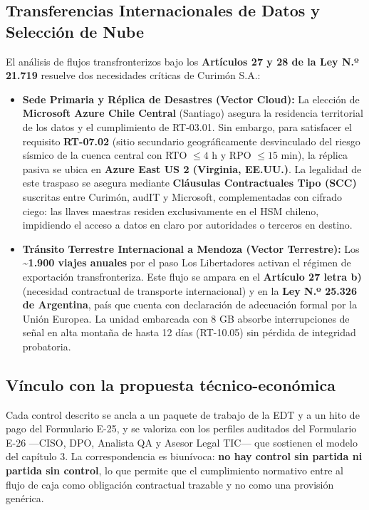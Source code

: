 \subsection{Transferencias Internacionales de Datos y Selección de Nube}\label{transferencias-internacionales-de-datos-y-selecciuxf3n-de-nube}

El análisis de flujos transfronterizos bajo los \textbf{Artículos 27 y 28 de la Ley N.º 21.719} resuelve dos necesidades críticas de Curimón S.A.:

\begin{itemize}
\tightlist
\item
  \textbf{Sede Primaria y Réplica de Desastres (Vector Cloud):} La elección de \textbf{Microsoft Azure Chile Central} (Santiago) asegura la residencia territorial de los datos y el cumplimiento de RT-03.01. Sin embargo, para satisfacer el requisito \textbf{RT-07.02} (sitio secundario geográficamente desvinculado del riesgo sísmico de la cuenca central con RTO \(\le 4\text{ h}\) y RPO \(\le 15\text{ min}\)), la réplica pasiva se ubica en \textbf{Azure East US 2 (Virginia, EE.UU.)}. La legalidad de este traspaso se asegura mediante \textbf{Cláusulas Contractuales Tipo (SCC)} suscritas entre Curimón, audIT y Microsoft, complementadas con cifrado ciego: las llaves maestras residen exclusivamente en el HSM chileno, impidiendo el acceso a datos en claro por autoridades o terceros en destino.
\item
  \textbf{Tránsito Terrestre Internacional a Mendoza (Vector Terrestre):} Los \textbf{\textasciitilde1.900 viajes anuales} por el paso Los Libertadores activan el régimen de exportación transfronteriza. Este flujo se ampara en el \textbf{Artículo 27 letra b)} (necesidad contractual de transporte internacional) y en la \textbf{Ley N.º 25.326 de Argentina}, país que cuenta con declaración de adecuación formal por la Unión Europea. La unidad embarcada con 8 GB absorbe interrupciones de señal en alta montaña de hasta 12 días (RT-10.05) sin pérdida de integridad probatoria.
\end{itemize}

\subsection{Vínculo con la propuesta técnico-económica}\label{vuxednculo-con-la-propuesta-tuxe9cnico-econuxf3mica}

Cada control descrito se ancla a un paquete de trabajo de la EDT y a un hito de pago del Formulario E-25, y se valoriza con los perfiles auditados del Formulario E-26 ---CISO, DPO, Analista QA y Asesor Legal TIC--- que sostienen el modelo del capítulo 3. La correspondencia es biunívoca: \textbf{no hay control sin partida ni partida sin control}, lo que permite que el cumplimiento normativo entre al flujo de caja como obligación contractual trazable y no como una provisión genérica.
